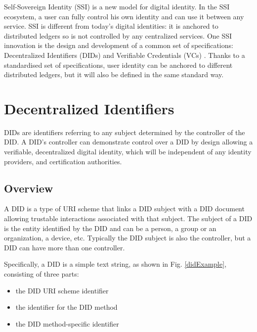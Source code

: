 
Self-Sovereign Identity (SSI) \cite{tobin2016inevitable} is a new model for digital identity. In the SSI ecosystem, a user can fully control his own identity and can use it between any service. SSI is different from today's digital identities: it is anchored to distributed ledgers so is not controlled by any centralized services.
One SSI innovation is the design and development of a common set of specifications: 
Decentralized Identifiers (DIDs) \cite{didW3C} and Verifiable Credentials (VCs) \cite{vcW3C}. 
Thanks to a standardised set of specifications, user identity can be anchored to different distributed ledgers, but it will also be defined in the same standard way.

\section{Decentralized Identifiers}  
DIDs \cite{didW3C} are identifiers referring to any subject determined by the controller of the DID.
A DID's controller can demonstrate control over a DID by design allowing a verifiable, decentralized digital identity, which will be independent of any identity providers, and certification authorities.

\subsection*{Overview}

A DID is a type of URI \cite{berners2005uniform} scheme that links a DID subject with a DID document allowing trustable interactions associated with that subject. The subject of a DID is the entity identified by the DID and can be a person, a group or an organization, a device, etc. Typically the DID subject is also the controller, but a DID can have more than one controller. 

Specifically, a DID is a simple text string, as shown in Fig. \ref{didExample}, consisting of three parts: 
\begin{itemize}
    \item the DID URI scheme identifier
    \item the identifier for the DID method
    \item the DID method-specific identifier
\end{itemize}


